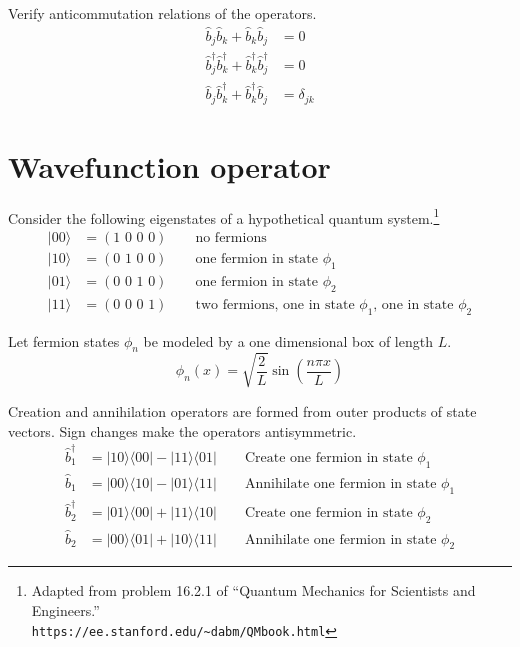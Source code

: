 \documentclass[12pt]{article}
\begin{document}
\noindent
Verify anticommutation relations of the operators.
\begin{align*}
\hat{b}_j\hat{b}_k+\hat{b}_k\hat{b}_j&=0
\\[2ex]
\hat{b}_j^\dag\hat{b}_k^\dag+\hat{b}_k^\dag\hat{b}_j^\dag&=0
\\[2ex]
\hat{b}_j\hat{b}_k^\dag+\hat{b}_k^\dag\hat{b}_j&=\delta_{jk}
\end{align*}

\newpage

\section{Wavefunction operator}
Consider the following eigenstates of a hypothetical quantum system.\footnote{
Adapted from problem 16.2.1 of ``Quantum Mechanics for Scientists and Engineers.''\\
{\tt https://ee.stanford.edu/{\textasciitilde}dabm/QMbook.html}}
\begin{align*}
|00\rangle&=(\text{1 0 0 0})\qquad\text{no fermions}\\
|10\rangle&=(\text{0 1 0 0})\qquad\text{one fermion in state $\phi_1$}\\
|01\rangle&=(\text{0 0 1 0})\qquad\text{one fermion in state $\phi_2$}\\
|11\rangle&=(\text{0 0 0 1})\qquad\text{two fermions, one in state $\phi_1$, one in state $\phi_2$}
\end{align*}

\noindent
Let fermion states $\phi_n$ be modeled by a one dimensional box of length $L$.
\begin{equation*}
\phi_n(x)=\sqrt{\frac{2}{L}}\sin\left(\frac{n\pi x}{L}\right)
\end{equation*}

\noindent
Creation and annihilation operators are formed from outer products of state vectors.
Sign changes make the operators antisymmetric.
\begin{align*}
\hat{b}_1^\dag&=|10\rangle\langle00|-|11\rangle\langle01| \qquad\text{Create one fermion in state $\phi_1$}
\\
\hat{b}_1&=|00\rangle\langle10|-|01\rangle\langle11| \qquad\text{Annihilate one fermion in state $\phi_1$}
\\
\hat{b}_2^\dag&=|01\rangle\langle00|+|11\rangle\langle10| \qquad\text{Create one fermion in state $\phi_2$}
\\
\hat{b}_2&=|00\rangle\langle01|+|10\rangle\langle11| \qquad\text{Annihilate one fermion in state $\phi_2$}
\end{align*}
\end{document}
